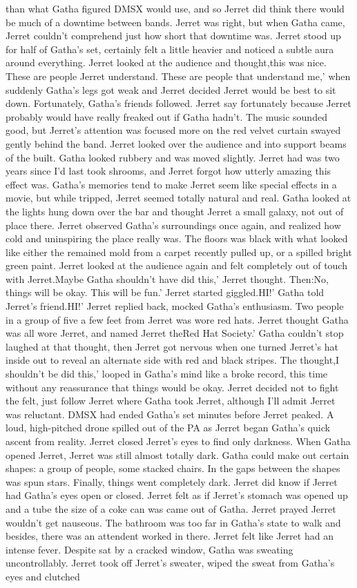 \documentclass[12pt]{book}
\begin{document}
than what Gatha figured DMSX would use, and so Jerret did think there would be much of a downtime between bands. Jerret was right, but when Gatha came, Jerret couldn't comprehend just how short that downtime was. Jerret stood up for half of Gatha's set, certainly felt a little heavier and noticed a subtle aura around everything. Jerret looked at the audience and thought,this was nice. These are people Jerret understand. These are people that understand me,' when suddenly Gatha's legs got weak and Jerret decided Jerret would be best to sit down. Fortunately, Gatha's friends followed. Jerret say fortunately because Jerret probably would have really freaked out if Gatha hadn't. The music sounded good, but Jerret's attention was focused more on the red velvet curtain swayed gently behind the band. Jerret looked over the audience and into support beams of the built. Gatha looked rubbery and was moved slightly. Jerret had was two years since I'd last took shrooms, and Jerret forgot how utterly amazing this effect was. Gatha's memories tend to make Jerret seem like special effects in a movie, but while tripped, Jerret seemed totally natural and real. Gatha looked at the lights hung down over the bar and thought Jerret a small galaxy, not out of place there. Jerret observed Gatha's surroundings once again, and realized how cold and uninspiring the place really was. The floors was black with what looked like either the remained mold from a carpet recently pulled up, or a spilled bright green paint. Jerret looked at the audience again and felt completely out of touch with Jerret.Maybe Gatha shouldn't have did this,' Jerret thought. Then:No, things will be okay. This will be fun.' Jerret started giggled.HI!' Gatha told Jerret's friend.HI!' Jerret replied back, mocked Gatha's enthusiasm. Two people in a group of five a few feet from Jerret was wore red hats. Jerret thought Gatha was all wore Jerret, and named Jerret theRed Hat Society.' Gatha couldn't stop laughed at that thought, then Jerret got nervous when one turned Jerret's hat inside out to reveal an alternate side with red and black stripes. The thought,I shouldn't be did this,' looped in Gatha's mind like a broke record, this time without any reassurance that things would be okay. Jerret decided not to fight the felt, just follow Jerret where Gatha took Jerret, although I'll admit Jerret was reluctant. DMSX had ended Gatha's set minutes before Jerret peaked. A loud, high-pitched drone spilled out of the PA as Jerret began Gatha's quick ascent from reality. Jerret closed Jerret's eyes to find only darkness. When Gatha opened Jerret, Jerret was still almost totally dark. Gatha could make out certain shapes: a group of people, some stacked chairs. In the gaps between the shapes was spun stars. Finally, things went completely dark. Jerret did know if Jerret had Gatha's eyes open or closed. Jerret felt as if Jerret's stomach was opened up and a tube the size of a coke can was came out of Gatha. Jerret prayed Jerret wouldn't get nauseous. The bathroom was too far in Gatha's state to walk and besides, there was an attendent worked in there. Jerret felt like Jerret had an intense fever. Despite sat by a cracked window, Gatha was sweating uncontrollably. Jerret took off Jerret's sweater, wiped the sweat from Gatha's eyes and clutched 
\end{document}
